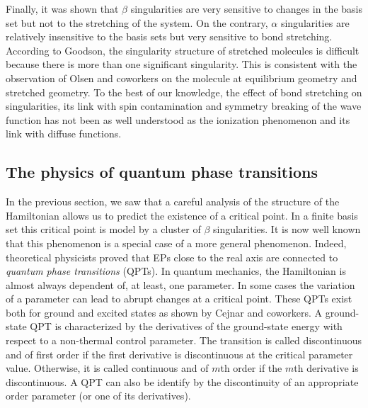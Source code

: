 \documentclass[aps,prb,reprint,noshowkeys,superscriptaddress]{revtex4-1}
\begin{document}
Finally, it was shown that $\beta$ singularities are very sensitive to changes in the basis set but not to the stretching of the system. On the contrary, $\alpha$ singularities are relatively insensitive to the basis sets but very sensitive to bond stretching. 
According to Goodson, \cite{Goodson_2004} the singularity structure of stretched molecules is difficult because there is more than one significant singularity. 
This is consistent with the observation of Olsen and coworkers \cite{Olsen_2000} on the  molecule at equilibrium geometry and stretched geometry. 
To the best of our knowledge, the effect of bond stretching on singularities, its link with spin contamination and symmetry breaking of the wave function has not been as well understood as the ionization phenomenon and its link with diffuse functions.  

\subsection{The physics of quantum phase transitions}

In the previous section, we saw that a careful analysis of the structure of the Hamiltonian allows us to predict the existence of a critical point. In a finite basis set this critical point is model by a cluster of $\beta$ singularities. It is now well known that this phenomenon is a special case of a more general phenomenon. Indeed, theoretical physicists proved that EPs close to the real axis are connected to \textit{quantum phase transitions} (QPTs). \cite{Heiss_1988,Heiss_2002,Cejnar_2005, Cejnar_2007, Cejnar_2009, Borisov_2015, Sindelka_2017} In quantum mechanics, the Hamiltonian is almost always dependent of, at least, one parameter. In some cases the variation of a parameter can lead to abrupt changes at a critical point. These QPTs exist both for ground and excited states as shown by Cejnar and coworkers. \cite{Cejnar_2009, Sachdev_2011, Cejnar_2015, Cejnar_2016, Caprio_2008, Macek_2019} A ground-state QPT is characterized by the derivatives of the ground-state energy with respect to a non-thermal control parameter. \cite{Cejnar_2009, Sachdev_2011} The transition is called discontinuous and of first order if the first derivative is discontinuous at the critical parameter value. Otherwise, it is called continuous and of $m$th order if the $m$th derivative is discontinuous. A QPT can also be identify by the discontinuity of an appropriate order parameter (or one of its derivatives). 
\end{document}

